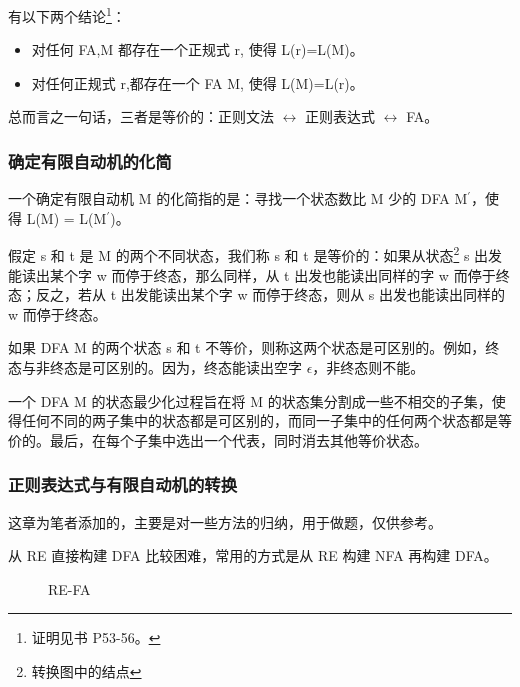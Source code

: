 有以下两个结论\footnote{证明见书 P53-56。}：
\begin{itemize}
    \item 对任何 FA,M 都存在一个正规式 r, 使得 L(r)=L(M)。
    \item 对任何正规式 r,都存在一个 FA M, 使得 L(M)=L(r)。
\end{itemize}

总而言之一句话，三者是等价的：正则文法 $\leftrightarrow$ 正则表达式 $\leftrightarrow$ FA。


\subsubsection{确定有限自动机的化简}

一个确定有限自动机 M 的化简指的是：寻找一个状态数比 M 少的 DFA M$^{'}$，使得 L(M) = L(M$^{'}$)。

假定 s 和 t 是 M 的两个不同状态，我们称 s 和 t 是等价的：如果从状态\footnote{转换图中的结点} s 出发能读出某个字 w 而停于终态，那么同样，从 t 出发也能读出同样的字 w 而停于终态；反之，若从 t 出发能读出某个字 w 而停于终态，则从 s 出发也能读出同样的 w 而停于终态。

如果 DFA M 的两个状态 s 和 t 不等价，则称这两个状态是可区别的。例如，终态与非终态是可区别的。因为，终态能读出空字 $\epsilon$，非终态则不能。

一个 DFA M 的状态最少化过程旨在将 M 的状态集分割成一些不相交的子集，使得任何不同的两子集中的状态都是可区别的，而同一子集中的任何两个状态都是等价的。最后，在每个子集中选出一个代表，同时消去其他等价状态。

\subsubsection{\textcolor{imp}{正则表达式与有限自动机的转换}}

这章为笔者添加的，主要是对一些方法的归纳，用于做题，仅供参考。

从 RE 直接构建 DFA 比较困难，常用的方式是从 RE 构建 NFA 再构建 DFA。

\begin{figure}[H]
    \centering
    \caption{RE-FA}
    \label{fig:RE-FA}
\end{figure}

